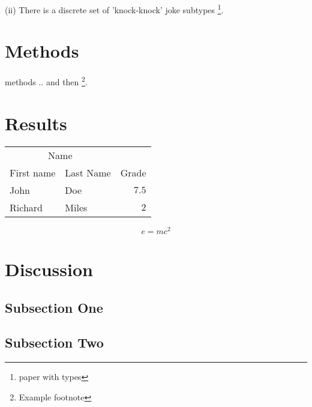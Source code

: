 \documentclass[twoside,twocolumn]{article}
\begin{document}
(ii) There is a discrete set of 'knock-knock' joke subtypes \footnote{paper with types}.




\section{Methods}

methods ..
and then \footnote{Example footnote}.


\section{Results}


\begin{center}
\begin{tabular}{llr}
\toprule
\multicolumn{2}{c}{Name} \\
\cmidrule(r){1-2}
First name & Last Name & Grade \\
\midrule
John & Doe & $7.5$ \\
Richard & Miles & $2$ \\
\bottomrule
\end{tabular}
\end{center}



\begin{equation}
\label{eq:emc}
e = mc^2
\end{equation}




\section{Discussion}

\subsection{Subsection One}




\subsection{Subsection Two}



\end{document}
